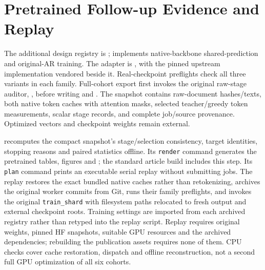 \section{Pretrained Follow-up Evidence and Replay}
\label{app:pretrained}

The additional design registry is ;
 implements native-backbone shared-prediction and original-AR training.
The adapter is , with the pinned upstream implementation vendored beside it.
Real-checkpoint preflights check all three variants in each family.
Full-cohort export first invokes the original raw-stage auditor, , before writing  and .
The snapshot contains raw-document hashes/texts, both native token caches with attention masks, selected teacher/greedy token measurements, scalar stage records, and complete job/source provenance.
Optimized vectors and checkpoint weights remain external.

 recomputes the compact snapshot's stage/selection consistency, target identities, stopping reasons and paired statistics offline.
Its \texttt{render} command generates the pretrained tables, figures and ; the standard article build includes this step.
Its \texttt{plan} command prints an executable serial replay without submitting jobs.
The replay restores the exact bundled native caches rather than retokenizing, archives the original worker commits from Git, runs their family preflights, and invokes the original \texttt{train\_shard} with filesystem paths relocated to fresh output and external checkpoint roots.
Training settings are imported from each archived registry rather than retyped into the replay script.
Replay requires original weights, pinned HF snapshots, suitable GPU resources and the archived dependencies; rebuilding the publication assets requires none of them.
CPU checks cover cache restoration, dispatch and offline reconstruction, not a second full GPU optimization of all six cohorts.

\begin{table}[t]
 \centering
 \small
 
 \caption{Pretrained paired differences on the same raw texts within each native-tokenizer family. Percentile 95\% intervals resample paired texts at fixed checkpoints and optimization seed. They do not represent independent training-seed uncertainty or matched-length greedy reliability.}
 \label{tab:pretrained-paired}
\end{table}

